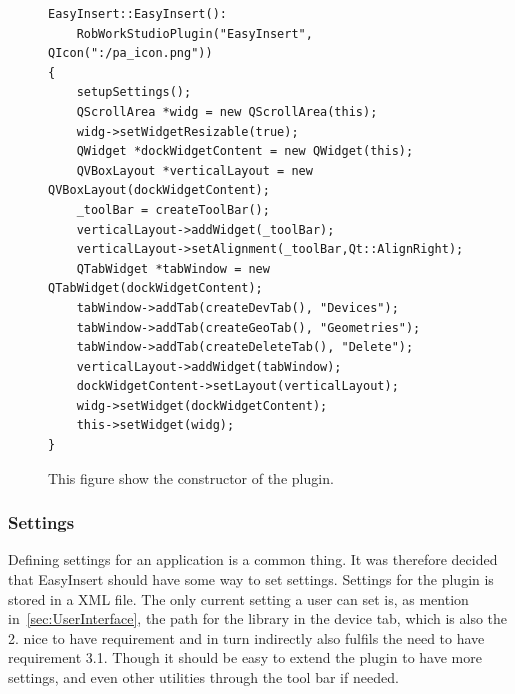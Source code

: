 \begin{figure}[h] %
\centering
\lstset{language=C++} 
\begin{lstlisting}[frame=single]  
EasyInsert::EasyInsert():
    RobWorkStudioPlugin("EasyInsert", QIcon(":/pa_icon.png"))
{
    setupSettings();
    QScrollArea *widg = new QScrollArea(this);
	widg->setWidgetResizable(true);
	QWidget *dockWidgetContent = new QWidget(this);
	QVBoxLayout *verticalLayout = new QVBoxLayout(dockWidgetContent);
    _toolBar = createToolBar();
    verticalLayout->addWidget(_toolBar);
    verticalLayout->setAlignment(_toolBar,Qt::AlignRight);
    QTabWidget *tabWindow = new QTabWidget(dockWidgetContent);
    tabWindow->addTab(createDevTab(), "Devices");
    tabWindow->addTab(createGeoTab(), "Geometries");
    tabWindow->addTab(createDeleteTab(), "Delete");
    verticalLayout->addWidget(tabWindow);
    dockWidgetContent->setLayout(verticalLayout);
    widg->setWidget(dockWidgetContent);
	this->setWidget(widg);
}
\end{lstlisting}
\caption{This figure show the constructor of the plugin.}
\label{fig:eiClass} 	
\end{figure}

\subsubsection{Settings}
\label{sec:Settings}
Defining settings for an application is a common thing. It was therefore decided that EasyInsert should have some way to set settings. Settings for the plugin is stored in a XML file. The only current setting a user can set is, as mention in~\ref{sec:UserInterface}, the path for the library in the device tab, which is also the 2. nice to have requirement and in turn indirectly also fulfils the need to have requirement 3.1. Though it should be easy to extend the plugin to have more settings, and even other utilities through the tool bar if needed.\\

